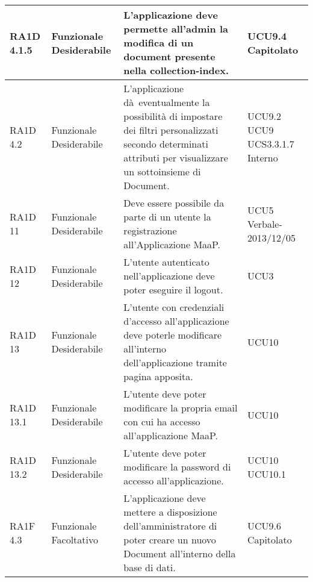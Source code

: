 \begin{center}
\begin{longtable}{ | l | p{2cm} | p{5cm} | p{1.7cm} |}
        RA1D 4.1.5 & Funzionale \newline  Desiderabile  & L'applicazione deve permette all'admin la modifica di un document presente nella collection-index. &  UCU9.4 \newline  Capitolato \newline  \\ \hline      
        RA1D 4.2  & Funzionale \newline  Desiderabile  & L'applicazione dà eventualmente la possibilità di impostare dei filtri personalizzati secondo determinati attributi per visualizzare un sottoinsieme di Document. &  UCU9.2 \newline  UCU9 \newline  UCS3.3.1.7 \newline  Interno \newline  \\ \hline      
        RA1D 11 & Funzionale \newline  Desiderabile  & Deve essere possibile da parte di un utente la registrazione all'Applicazione MaaP. &  UCU5 \newline  Verbale-2013/12/05 \newline  \\ \hline      
        RA1D 12 & Funzionale \newline  Desiderabile  & L'utente autenticato nell'applicazione deve poter eseguire il logout.  &  UCU3 \newline  \\ \hline      
        RA1D 13 & Funzionale \newline  Desiderabile  & L'utente con credenziali d'accesso all'applicazione deve poterle modificare all'interno dell'applicazione tramite pagina apposita. &  UCU10 \newline  \\ \hline      
        RA1D 13.1 & Funzionale \newline  Desiderabile  & L'utente deve poter modificare la propria email con cui ha accesso all'applicazione MaaP. &  UCU10 \newline  \\ \hline      
        RA1D 13.2 & Funzionale \newline  Desiderabile  & L'utente deve poter modificare la password di accesso all'applicazione. &  UCU10 \newline  UCU10.1 \newline  \\ \hline      
        RA1F 4.3 & Funzionale \newline  Facoltativo  & L'applicazione deve mettere a disposizione dell'amministratore di poter creare un nuovo Document all'interno della base di dati. &  UCU9.6 \newline  Capitolato \newline  \\ \hline      

\end{longtable}
\end{center}
